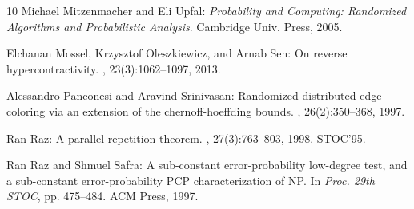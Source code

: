 \documentclass[11pt]{article}
\numberwithin{equation}{section}
\theoremstyle{definition}
\theoremstyle{plain}
\begin{document}
\begin{thebibliography}{10}
{\sc Michael Mitzenmacher and Eli Upfal}: {\em Probability and Computing:
  Randomized Algorithms and Probabilistic Analysis}.
\newblock Cambridge Univ. Press, 2005.

{\sc Elchanan Mossel, Krzysztof Oleszkiewicz, and Arnab Sen}: On reverse
  hypercontractivity.
, 23(3):1062--1097, 2013.

{\sc Alessandro Panconesi and Aravind Srinivasan}: Randomized distributed edge
  coloring via an extension of the chernoff-hoeffding bounds.
, 26(2):350--368, 1997.
\newblock [\epfmtdoi{10.1137/S0097539793250767}]

{\sc Ran Raz}: A parallel repetition theorem.
, 27(3):763--803, 1998.
\newblock \prelim \href{https://doi.org/10.1145/225058.225181}{STOC'95}.
\newblock [\epfmtdoi{10.1137/S0097539795280895}]

{\sc Ran Raz and Shmuel Safra}: A sub-constant error-probability low-degree
  test, and a sub-constant error-probability {PCP} characterization of {NP}.
\newblock In {\em Proc. 29th STOC}, pp. 475--484. ACM Press, 1997.
\newblock [\epfmtdoi{10.1145/258533.258641}]

\end{thebibliography}
\end{document}
